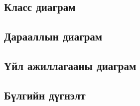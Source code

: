 	\subsection{Класс диаграм}

	\subsection{Дарааллын диаграм}

	\subsection{Үйл ажиллагааны диаграм}

	\subsection{Бүлгийн дүгнэлт}